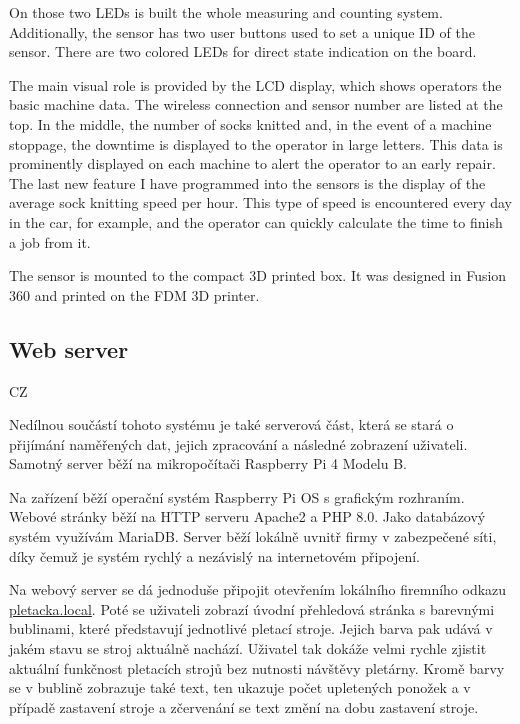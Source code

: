 \documentclass[12pt, a4paper]{article}
\begin{document}
On those two LEDs is built the whole measuring and counting system.
Additionally, the sensor has two user buttons used to set a unique ID of the sensor.
There are two colored LEDs for direct state indication on the board.


The main visual role is provided by the LCD display, which shows operators the basic machine data.
The wireless connection and sensor number are listed at the top.
In the middle, the number of socks knitted and, in the event of a machine stoppage, the downtime is displayed to the operator in large letters.
This data is prominently displayed on each machine to alert the operator to an early repair.
The last new feature I have programmed into the sensors is the display of the average sock knitting speed per hour.
This type of speed is encountered every day in the car, for example, and the operator can quickly calculate the time to finish a job from it.

The sensor is mounted to the compact 3D printed box.
It was designed in Fusion 360 and printed on the FDM 3D printer.

\subsection*{Web server}

CZ

Nedílnou součástí tohoto systému je také serverová část, která se stará o přijímání naměřených dat, jejich zpracování a následné zobrazení uživateli.
Samotný server běží na mikropočítači Raspberry Pi 4 Modelu B.

Na zařízení běží operační systém Raspberry Pi OS s grafickým rozhraním.
Webové stránky běží na HTTP serveru Apache2 a PHP 8.0.
Jako databázový systém využívám MariaDB.
Server běží lokálně uvnitř firmy v zabezpečené síti, díky čemuž je systém rychlý a nezávislý na internetovém připojení.

Na webový server se dá jednoduše připojit otevřením lokálního firemního odkazu \newline\href{http://pletacka.local}{pletacka.local}.
Poté se uživateli zobrazí úvodní přehledová stránka s barevnými bublinami, které představují jednotlivé pletací stroje.
Jejich barva pak udává v jakém stavu se stroj aktuálně nachází. Uživatel tak dokáže velmi rychle zjistit aktuální funkčnost pletacích strojů bez nutnosti návštěvy pletárny.
Kromě barvy se v bublině zobrazuje také text, ten ukazuje počet upletených ponožek a v případě zastavení stroje a zčervenání se text změní na dobu zastavení stroje.
\end{document}
